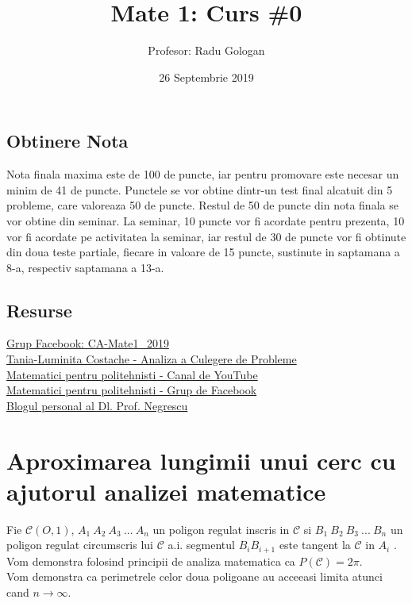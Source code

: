 \documentclass{article}
\title{Mate 1: Curs \#0}
\author{Profesor: Radu Gologan}
\date{26 Septembrie 2019}
\newcommand{\handC}{\mathscr{C}}
\begin{document}
    
    \maketitle
        \subsection*{Obtinere Nota}
            Nota finala maxima este de 100 de puncte, iar pentru promovare este necesar un minim de 41 de puncte. Punctele se vor obtine dintr-un test final alcatuit din 5 probleme, care valoreaza 50 de puncte. Restul de 50 de puncte din nota finala se vor obtine din seminar. La seminar, 10 puncte vor fi acordate pentru prezenta, 10 vor fi acordate pe activitatea la seminar, iar restul de 30 de puncte vor fi obtinute din doua teste partiale, fiecare in valoare de 15 puncte, sustinute in saptamana a 8-a, respectiv saptamana a 13-a.
        \subsection*{Resurse}
            \href{https://www.facebook.com/groups/723259271431305}{Grup Facebook: CA-Mate1\_2019}\\
            \href{https://ro.scribd.com/doc/77477726/Tania-Luminita-Costache-Analiza-a-Culegere-de-Probleme}{Tania-Luminita Costache - Analiza a Culegere de Probleme}\\
            \href{https://www.youtube.com/channel/UCRcpjorgGE-3-Z-Sg5wu70Q}{Matematici pentru politehnisti - Canal de YouTube}\\
            \href{https://www.facebook.com/groups/846192945437641/}{Matematici pentru politehnisti - Grup de Facebook}\\
            \href{https://alexnegrescu.wordpress.com/}{Blogul personal al Dl. Prof. Negrescu}\\

    \clearpage

    \section{Aproximarea lungimii unui cerc cu ajutorul analizei matematice}
        Fie $\handC (O, 1)$, $A_1\ A_2\ A_3\ ...\ A_n$ un poligon regulat inscris in $\handC$ si $B_1\ B_2\ B_3\ ...\ B_n$ un poligon regulat circumscris lui $\handC$ a.i. segmentul $B_iB_{i+1}$ este tangent la $\handC$ in $A_i$ . Vom demonstra folosind principii de analiza matematica ca $P(\handC)=2\pi$.\\
        Vom demonstra ca perimetrele celor doua poligoane au acceeasi limita atunci cand $n \to \infty$.\\
\end{document}
